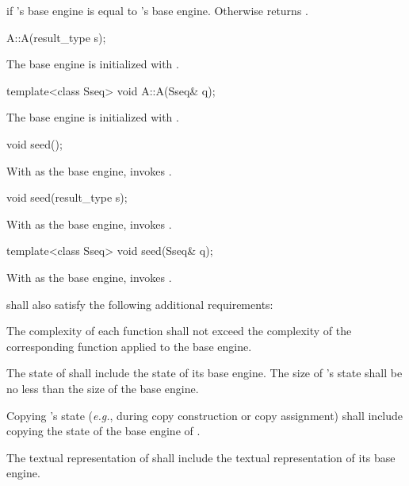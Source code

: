 \begin{itemdescr}
\pnum\returns
  if 's base engine is equal to 's base engine.
 Otherwise returns .
\end{itemdescr}


\begin{itemdecl}
A::A(result_type s);  
\end{itemdecl}

\begin{itemdescr}
\pnum\effects
 The base engine is initialized
 with .
\end{itemdescr}


\begin{itemdecl}
template<class Sseq> void A::A(Sseq& q);  
\end{itemdecl}

\begin{itemdescr}
\pnum\effects
 The base engine is initialized
 with .
\end{itemdescr}

\begin{itemdecl}
void seed();  
\end{itemdecl}

\begin{itemdescr}
\pnum\effects
 With  as the base engine, invokes .
\end{itemdescr}

\begin{itemdecl}
void seed(result_type s);  
\end{itemdecl}

\begin{itemdescr}
\pnum\effects
 With  as the base engine, invokes .
\end{itemdescr}

\begin{itemdecl}
template<class Sseq> void seed(Sseq& q);  
\end{itemdecl}

\begin{itemdescr}
\pnum\effects
 With  as the base engine, invokes .
\end{itemdescr}

\pnum
{} shall also satisfy
the following additional requirements:
\begin{enumeratea}
 \item
   The complexity
   of each function
   shall not exceed the complexity
   of the corresponding function
   applied to the base engine.
 \item
   The state
   of 
   shall include the state
   of its base engine.
   The size of 's state
   shall be no less than the size of the base engine.
 \item
   Copying 's state
   (\textit{e.g.}, during copy construction or copy assignment)
   shall include copying
   the state of the base engine of .
 \item
   The textual representation
   of 
   shall include
   the textual representation of its base engine.
\end{enumeratea}


